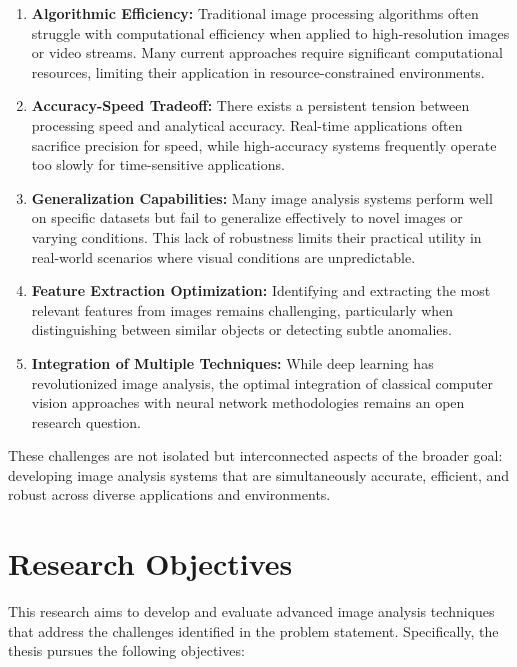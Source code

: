 \begin{enumerate}
    \item \textbf{Algorithmic Efficiency:} Traditional image processing algorithms often struggle with computational efficiency when applied to high-resolution images or video streams. Many current approaches require significant computational resources, limiting their application in resource-constrained environments.
    
    \item \textbf{Accuracy-Speed Tradeoff:} There exists a persistent tension between processing speed and analytical accuracy. Real-time applications often sacrifice precision for speed, while high-accuracy systems frequently operate too slowly for time-sensitive applications.
    
    \item \textbf{Generalization Capabilities:} Many image analysis systems perform well on specific datasets but fail to generalize effectively to novel images or varying conditions. This lack of robustness limits their practical utility in real-world scenarios where visual conditions are unpredictable.
    
    \item \textbf{Feature Extraction Optimization:} Identifying and extracting the most relevant features from images remains challenging, particularly when distinguishing between similar objects or detecting subtle anomalies.
    
    \item \textbf{Integration of Multiple Techniques:} While deep learning has revolutionized image analysis, the optimal integration of classical computer vision approaches with neural network methodologies remains an open research question.
\end{enumerate}

These challenges are not isolated but interconnected aspects of the broader goal: developing image analysis systems that are simultaneously accurate, efficient, and robust across diverse applications and environments.

\section{Research Objectives}
This research aims to develop and evaluate advanced image analysis techniques that address the challenges identified in the problem statement. Specifically, the thesis pursues the following objectives:

